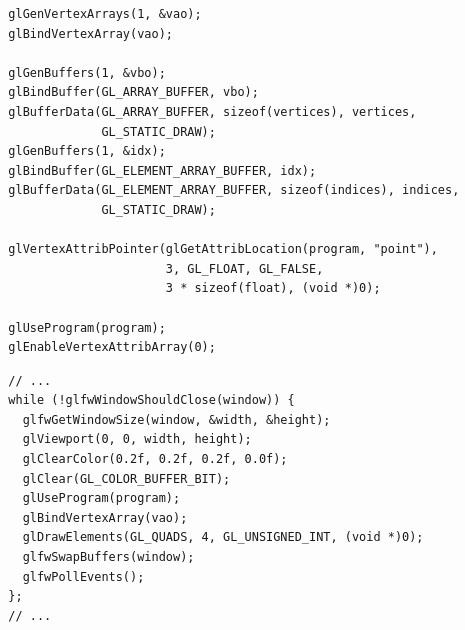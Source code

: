 \documentclass[calcdimensions,landscape,letterpaper]{powersem}
\newcommand{\thecurrentheading}{}
\newcommand{\heading}[1]{\renewcommand{\thecurrentheading}{#1}}
\begin{document}
\begin{slide}
    \heading{Vertex Array Object}
    \begin{center}
        \begin{minipage}[c]{.95\textwidth}
            \begin{verbatim}
  glGenVertexArrays(1, &vao);
  glBindVertexArray(vao);

  glGenBuffers(1, &vbo);
  glBindBuffer(GL_ARRAY_BUFFER, vbo);
  glBufferData(GL_ARRAY_BUFFER, sizeof(vertices), vertices,
               GL_STATIC_DRAW);
  glGenBuffers(1, &idx);
  glBindBuffer(GL_ELEMENT_ARRAY_BUFFER, idx);
  glBufferData(GL_ELEMENT_ARRAY_BUFFER, sizeof(indices), indices,
               GL_STATIC_DRAW);

  glVertexAttribPointer(glGetAttribLocation(program, "point"),
                        3, GL_FLOAT, GL_FALSE,
                        3 * sizeof(float), (void *)0);

  glUseProgram(program);
  glEnableVertexAttribArray(0);
            \end{verbatim}
        \end{minipage}
    \end{center}
\end{slide}

\begin{slide}
    \heading{Render Quads}
    \begin{center}
        \begin{minipage}[c]{.95\textwidth}
            \begin{verbatim}
  // ...
  while (!glfwWindowShouldClose(window)) {
    glfwGetWindowSize(window, &width, &height);
    glViewport(0, 0, width, height);
    glClearColor(0.2f, 0.2f, 0.2f, 0.0f);
    glClear(GL_COLOR_BUFFER_BIT);
    glUseProgram(program);
    glBindVertexArray(vao);
    glDrawElements(GL_QUADS, 4, GL_UNSIGNED_INT, (void *)0);
    glfwSwapBuffers(window);
    glfwPollEvents();
  };
  // ...
            \end{verbatim}
        \end{minipage}
    \end{center}
\end{slide}
\end{document}
